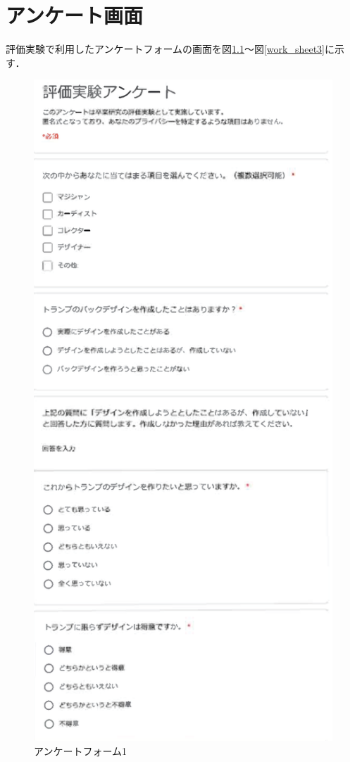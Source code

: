 \chapter{アンケート画面}
評価実験で利用したアンケートフォームの画面を図\ref{work_sheet1}～図\ref{work_sheet3}に示す．

\begin{figure}[htbp]
    \begin{center}
        \centering
        \includegraphics[scale=0.8]{image/work_sheet1.eps}
        \caption{アンケートフォーム1}
        \label{work_sheet1}
    \end{center}
\end{figure}

